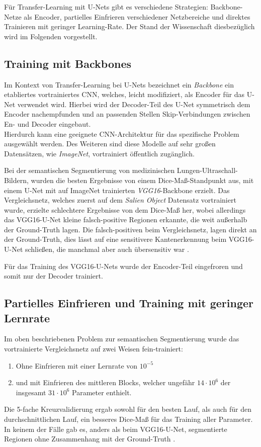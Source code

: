 Für Transfer-Learning mit U-Nets gibt es verschiedene Strategien: Backbone-Netze als Encoder, 
partielles Einfrieren verschiedener Netzbereiche und direktes Trainieren mit geringer Learning-Rate.
Der Stand der Wissenschaft diesbezüglich wird im Folgenden vorgestellt. 

\subsection{Training mit Backbones}

Im Kontext von Transfer-Learning bei U-Nets bezeichnet ein \textit{Backbone} ein etabliertes vortrainiertes \ac{CNN}, 
welches, leicht modifiziert, als Encoder für das U-Net verwendet wird. Hierbei wird der Decoder-Teil des U-Net 
symmetrisch dem Encoder nachempfunden und an passenden Stellen Skip-Verbindungen zwischen En- und Decoder eingebaut. \\
Hierdurch kann eine geeignete \ac{CNN}-Architektur für das spezifische Problem ausgewählt werden. Des Weiteren sind diese 
Modelle auf sehr großen Datensätzen, wie \textit{ImageNet}, vortrainiert öffentlich zugänglich. 

Bei der semantischen Segmentierung von medizinischen Lungen-Ultraschall-Bildern, wurden die besten Ergebnisse von einem Dice-Maß-Standpunkt aus, 
mit einem U-Net mit auf ImageNet trainierten \textit{VGG16}-Backbone erzielt. Das Vergleichsnetz, welches zuerst auf dem \textit{Salien Object}
Datensatz vortrainiert wurde, erzielte schlechtere Ergebnisse von dem Dice-Maß her, wobei allerdings das VGG16-U-Net kleine falsch-positive 
Regionen erkannte, die weit außerhalb der Ground-Truth lagen. Die falsch-positiven beim Vergleichsnetz, lagen direkt an der Ground-Truth, 
dies lässt auf eine sensitivere Kantenerkennung beim VGG16-U-Net schließen, die manchmal aber auch übersensitiv war \cite{Cheng.05.10.2021}. 

Für das Training des VGG16-U-Nets wurde der Encoder-Teil eingefroren und somit nur der Decoder trainiert. 

\subsection{Partielles Einfrieren und Training mit geringer Lernrate}

Im oben beschriebenen Problem zur semantischen Segmentierung wurde das vortrainierte Vergleichsnetz auf zwei Weisen fein-trainiert:
\begin{enumerate}
	\item Ohne Einfrieren mit einer Lernrate von $10^{-5}$
	\item und mit Einfrieren des mittleren Blocks, welcher ungefähr $14\cdot 10^6$ der insgesamt $31 \cdot 10^6$ Parameter enthielt. 
\end{enumerate}
Die 5-fache Kreuzvalidierung ergab sowohl für den besten Lauf, als auch für den durchschnittlichen Lauf, ein besseres Dice-Maß 
für das Training aller Parameter. In keinem der Fälle gab es, anders als beim VGG16-U-Net, segmentierte Regionen ohne Zusammenhang mit der Ground-Truth \cite{Cheng.05.10.2021}. 

